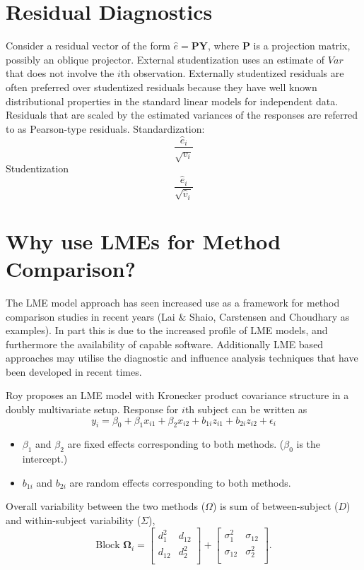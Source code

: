 \documentclass[12pt, a4paper]{report}
\theoremstyle{plain}
\theoremstyle{definition}
\theoremstyle{remark}
\begin{document}
	
	
	
	
	\section{Residual Diagnostics}
	
	Consider a residual vector of the form $\hat{e} = \boldsymbol{PY} $, where $\boldsymbol{P}$ is a projection matrix, possibly an oblique projector.
	External studentization uses an estimate of $Var$ that does not involve the $i$th observation.
	Externally studentized residuals are often preferred over studentized residuals because they have well known distributional
	properties in the standard linear models for independent data.
	Residuals that are scaled by the estimated variances of the responses are referred to as Pearson-type residuals.
	Standardization: \[ \frac{\hat{e}_i}{\sqrt{v_i}}\]
	Studentization \[ \frac{\hat{e}_i}{\sqrt{\hat{v}_i}}\]
	
	\section{Why use LMEs for Method Comparison?}
	The LME model approach has seen increased use as a framework for method comparison studies in recent years (Lai $\&$ Shaio, Carstensen and Choudhary as examples). In part this is due to the increased profile of LME models, and furthermore the availability of capable software. Additionally LME based approaches may utilise the diagnostic and influence analysis techniques that have been developed in recent times.
	
	
	Roy proposes an LME model with Kronecker product covariance structure in a doubly multivariate setup. Response for $i$th subject can be written as
	\[ y_i = \beta_0 + \beta_1x_{i1} + \beta_2x_{i2} + b_{1i}z_{i1}  + b_{2i}z_{i2} + \epsilon_i \]
	\begin{itemize}
		\item $\beta_1$ and $\beta_2$ are fixed effects corresponding to both methods. ($\beta_0$ is the intercept.)
		\item $b_{1i}$ and $b_{2i}$ are random effects corresponding to both methods.
	\end{itemize}
	
	Overall variability between the two methods ($\Omega$) is sum of between-subject ($D$) and within-subject variability ($\Sigma$),
	\[
	\mbox{Block } \boldsymbol{\Omega}_i = \left[ \begin{array}{cc} d^2_1 & d_{12}\\ d_{12} & d^2_2\\ \end{array} \right]
	+ \left[\begin{array}{cc} \sigma^2_1 & \sigma_{12}\\ \sigma_{12} & \sigma^2_2\\ \end{array}\right].
	\]
	
\end{document}
